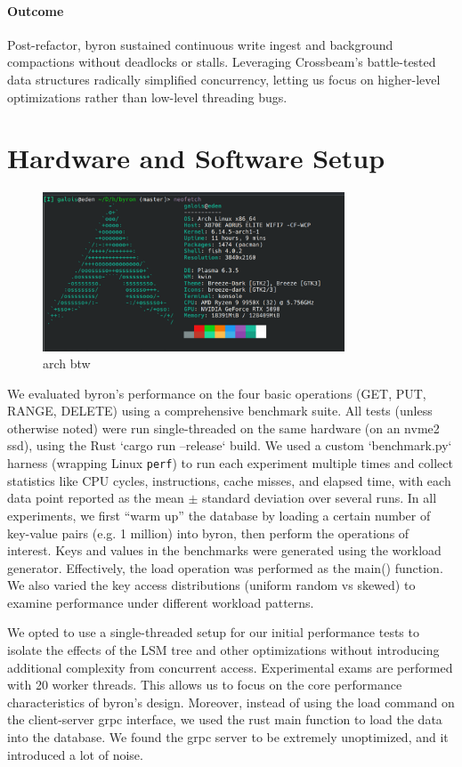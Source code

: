 \documentclass[10pt]{article}
\begin{document}
\paragraph{Outcome}
Post-refactor, byron sustained continuous write ingest and background compactions without deadlocks or stalls. Leveraging Crossbeam’s battle-tested data structures radically simplified concurrency, letting us focus on higher-level optimizations rather than low-level threading bugs.


\section{Hardware and Software Setup}
\begin{figure}[htbp]
  \centering
  \includegraphics[width=0.8\textwidth]{neofetch.png}
  \caption{arch btw}
  \label{fig:neofetch}
\end{figure}

We evaluated byron’s performance on the four basic operations (GET, PUT, RANGE, DELETE) using a comprehensive benchmark suite. All tests (unless otherwise noted) were run single-threaded on the same hardware (on an nvme2 ssd), using the Rust `cargo run --release` build. We used a custom `benchmark.py` harness (wrapping Linux \texttt{perf}) to run each experiment multiple times and collect statistics like CPU cycles, instructions, cache misses, and elapsed time, with each data point reported as the mean $\pm$ standard deviation over several runs. In all experiments, we first “warm up” the database by loading a certain number of key-value pairs (e.g. 1 million) into byron, then perform the operations of interest. Keys and values in the benchmarks were generated using the workload generator. Effectively, the load operation was performed as the main() function. We also varied the key access distributions (uniform random vs skewed) to examine performance under different workload patterns.

We opted to use a single-threaded setup for our initial performance tests to isolate the effects of the LSM tree and other optimizations without introducing additional complexity from concurrent access. Experimental exams are performed with 20 worker threads. This allows us to focus on the core performance characteristics of byron’s design.
Moreover, instead of using the load command on the client-server grpc interface, we used the rust main function to load the data into the database. We found the grpc server to be extremely unoptimized, and it introduced a lot of noise.
\end{document}
